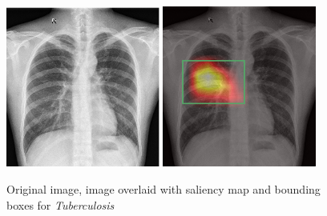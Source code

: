 \documentclass[12pt,oneside,a4paper]{report}
\begin{document}
\begin{figure}[H]
  \centering
  \includegraphics[width=0.45\textwidth]{images/preds/TB}\hspace{0.01\textwidth}%
  \includegraphics[width=0.45\textwidth]{images/preds/TB_cam}\\[0.01\textwidth]
  \caption{Original image, image overlaid with saliency map and bounding boxes
    for \emph{Tuberculosis}}
  \label{examples_16}
\end{figure}
\end{document}
